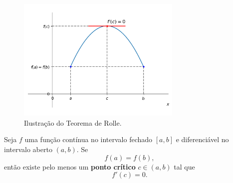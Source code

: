 \begin{figure}[H]
  \centering
  \includegraphics[width=0.7\textwidth]{./cap_apderiv/dados/fig_teo_Rolle/fig_teo_Rolle}
  \caption{Ilustração do Teorema de Rolle.}
  \label{fig:teo_Rolle}
\end{figure}

\begin{teo}
  Seja $f$ uma função contínua no intervalo fechado $[a, b]$ e diferenciável no intervalo aberto $(a, b)$. Se
  \begin{equation}
    f(a)=f(b),
  \end{equation}
  então existe pelo menos um {\bf ponto crítico} $c\in (a, b)$ tal que
  \begin{equation}
    f'(c)=0.
  \end{equation}
\end{teo}

